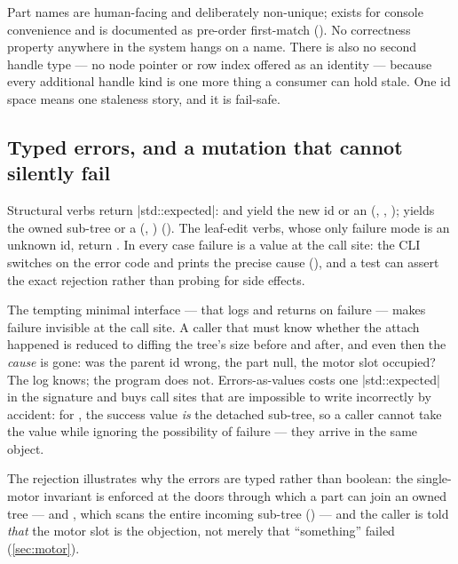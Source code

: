 \begin{designrule}
Part names are human-facing and deliberately non-unique;  exists for
console convenience and is documented as pre-order first-match
(). No correctness property anywhere in the system hangs
on a name. There is also no second handle type --- no node pointer or row index offered as an
identity --- because every additional handle kind is one more thing a consumer can hold
stale. One id space means one staleness story, and it is fail-safe.
\end{designrule}

\subsection{Typed errors, and a mutation that cannot silently fail}\label{sec:philosophy-errors}

Structural verbs return \cppinline|std::expected|:  and 
yield the new id or an  (, ,
);  yields the owned sub-tree or a 
(, ) (). The leaf-edit verbs,
whose only failure mode is an unknown id, return . In every case failure is a
value at the call site: the CLI switches on the error code and prints the precise cause
(), and a test can assert the exact rejection rather than probing for
side effects.

\begin{rejected}
The tempting minimal interface ---  that logs and returns on failure
--- makes failure invisible at the call site. A caller that must know whether the attach
happened is reduced to diffing the tree's size before and after, and even then the
\emph{cause} is gone: was the parent id wrong, the part null, the motor slot occupied? The
log knows; the program does not. Errors-as-values costs one \cppinline|std::expected| in the
signature and buys call sites that are impossible to write incorrectly by accident: for
, the success value \emph{is} the detached sub-tree, so a caller cannot take the
value while ignoring the possibility of failure --- they arrive in the same object.
\end{rejected}

The  rejection illustrates why the errors are typed rather than boolean:
the single-motor invariant is enforced at the doors through which a part can join an owned
tree ---  and , which scans the entire incoming sub-tree
() --- and the caller is told
\emph{that} the motor slot is the objection, not merely that ``something'' failed
(\cref{sec:motor}).

